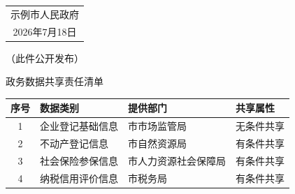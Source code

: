 \documentclass[linespread=1.81, twoside]{ctexart}
\begin{document}
\par\nointerlineskip
\vspace{\baselineskip}
\noindent\hfill
\begin{tabular}{@{}c@{}}
  示例市人民政府\\
  2026年7月18日
\end{tabular}\hspace*{4\ccwd}\par
\noindent\hspace{2\ccwd}（此件公开发布）\par

\clearpage
{}\par
\par\nointerlineskip
\vspace{\baselineskip}
{\centering{}\xbsong 政务数据共享责任清单\par}
\par\nointerlineskip
\vspace{\baselineskip}

\begin{center}
  \renewcommand{\arraystretch}{1.6}
  {
  \begin{tabular}{|c|p{38mm}|p{34mm}|p{28mm}|}
    \hline
    序号 & 数据类别 & 提供部门 & 共享属性 \\
    \hline
    1 & 企业登记基础信息 & 市市场监管局 & 无条件共享 \\
    \hline
    2 & 不动产登记信息 & 市自然资源局 & 有条件共享 \\
    \hline
    3 & 社会保险参保信息 & 市人力资源社会保障局 & 有条件共享 \\
    \hline
    4 & 纳税信用评价信息 & 市税务局 & 有条件共享 \\
    \hline
  \end{tabular}}
\end{center}
\end{document}
